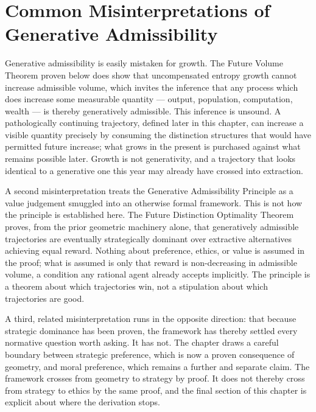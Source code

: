 \documentclass[12pt,twoside,openright]{book}
\begin{document}
\section{Common Misinterpretations of Generative
  Admissibility}
\label{sec:ch15-misinterpretations}

Generative admissibility is easily mistaken for growth. The
Future Volume Theorem proven below does show that
uncompensated entropy growth cannot increase admissible
volume, which invites the inference that any process which
does increase some measurable quantity --- output,
population, computation, wealth --- is thereby generatively
admissible. This inference is unsound. A pathologically
continuing trajectory, defined later in this chapter, can
increase a visible quantity precisely by consuming the
distinction structures that would have permitted future
increase; what grows in the present is purchased against
what remains possible later. Growth is not
generativity, and
a trajectory that looks identical to a generative one this
year may already have crossed into extraction.

A second misinterpretation treats the Generative
Admissibility Principle as a value judgement smuggled into
an otherwise formal framework. This is not how the principle
is established here. The Future Distinction Optimality
Theorem proves, from the prior geometric machinery alone,
that generatively admissible trajectories are eventually
strategically dominant over extractive alternatives achieving
equal reward. Nothing about preference, ethics, or value is
assumed in the proof; what is assumed is only that reward is
non-decreasing in admissible volume, a condition any rational
agent already accepts implicitly. The principle is a theorem
about which trajectories win, not a stipulation about which
trajectories are good.

A third, related misinterpretation runs in the opposite
direction: that because strategic dominance has been proven,
the framework has thereby settled every normative question
worth asking. It has not. The chapter draws a careful
boundary between strategic preference, which is now a proven
consequence of geometry, and moral preference, which remains
a further and separate claim. The framework crosses from
geometry to strategy by proof. It does not thereby cross
from strategy to ethics by the same proof, and the final
section of this chapter is explicit about where the
derivation stops.
\end{document}

